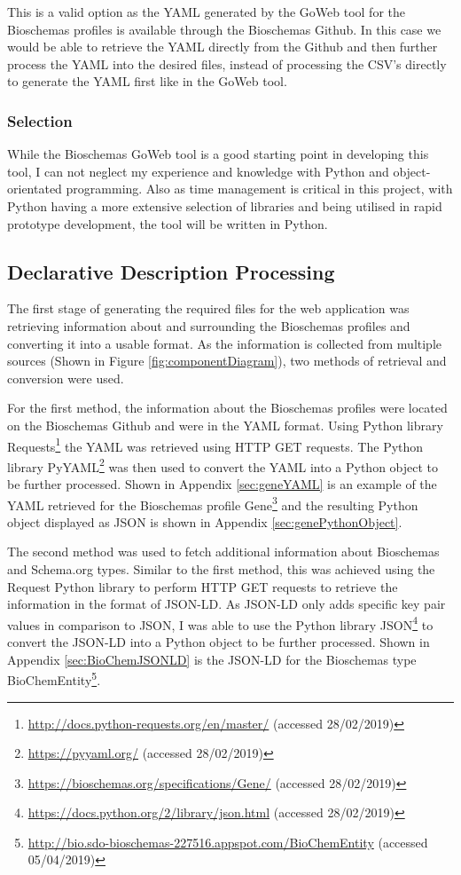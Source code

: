 This is a valid option as the YAML generated by the GoWeb tool for the Bioschemas profiles is available through the Bioschemas Github. In this case we would be able to retrieve the YAML directly from the Github and then further process the YAML into the desired files, instead of processing the CSV's directly to generate the YAML first like in the GoWeb tool.

\subsubsection{Selection}
While the Bioschemas GoWeb tool is a good starting point in developing this tool, I can not neglect my experience and knowledge with Python and object-orientated programming. Also as time management is critical in this project, with Python having a more extensive selection of libraries and being utilised in rapid prototype development, the tool will be written in Python. 

\subsection{Declarative Description Processing}\label{sec:declarative}
The first stage of generating the required files for the web application was retrieving information about and surrounding the Bioschemas profiles and converting it into a usable format. As the information is collected from multiple sources (Shown in Figure \ref{fig:componentDiagram}), two methods of retrieval and conversion were used. 

For the first method, the information about the Bioschemas profiles were located on the Bioschemas Github and were in the YAML format. Using Python library Requests\footnote{\url{http://docs.python-requests.org/en/master/} (accessed 28/02/2019)} the YAML was retrieved using HTTP GET requests. The Python library PyYAML\footnote{\url{https://pyyaml.org/} (accessed 28/02/2019)} was then used to convert the YAML into a Python object to be further processed. Shown in Appendix \ref{sec:geneYAML} is an example of the YAML retrieved for the Bioschemas profile Gene\footnote{\url{https://bioschemas.org/specifications/Gene/} (accessed 28/02/2019)} and the resulting Python object displayed as JSON is shown in Appendix \ref{sec:genePythonObject}.

\newpage
The second method was used to fetch additional information about Bioschemas and Schema.org types. Similar to the first method, this was achieved  using the Request Python library to perform HTTP GET requests to retrieve the information in the format of JSON-LD. As JSON-LD only adds specific key pair values in comparison to JSON, I was able to use the Python library JSON\footnote{\url{https://docs.python.org/2/library/json.html} (accessed 28/02/2019)} to convert the JSON-LD into a Python object to be further processed. Shown in Appendix \ref{sec:BioChemJSONLD} is the JSON-LD for the Bioschemas type BioChemEntity\footnote{\url{http://bio.sdo-bioschemas-227516.appspot.com/BioChemEntity} (accessed 05/04/2019)}.

